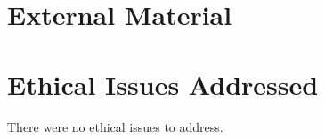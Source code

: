 \begin{appendices}
\chapter{External Material}
\chapter{Ethical Issues Addressed}
There were no ethical issues to address.
\end{appendices}